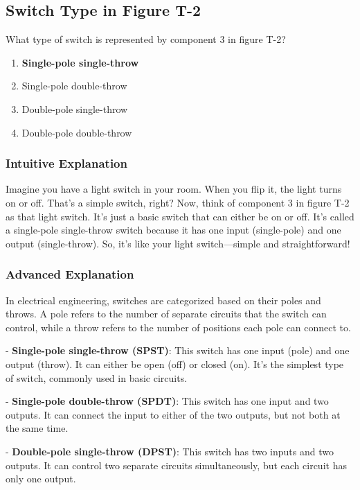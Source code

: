 \subsection{Switch Type in Figure T-2}
\label{T6A12(A)}

\begin{tcolorbox}[colback=gray!10!white,colframe=black!75!black,title=T6A12(A)]
What type of switch is represented by component 3 in figure T-2?
\begin{enumerate}[label=\Alph*)]
    \item \textbf{Single-pole single-throw}
    \item Single-pole double-throw
    \item Double-pole single-throw
    \item Double-pole double-throw
\end{enumerate}
\end{tcolorbox}

\subsubsection{Intuitive Explanation}
Imagine you have a light switch in your room. When you flip it, the light turns on or off. That's a simple switch, right? Now, think of component 3 in figure T-2 as that light switch. It’s just a basic switch that can either be on or off. It’s called a single-pole single-throw switch because it has one input (single-pole) and one output (single-throw). So, it’s like your light switch—simple and straightforward!

\subsubsection{Advanced Explanation}
In electrical engineering, switches are categorized based on their poles and throws. A pole refers to the number of separate circuits that the switch can control, while a throw refers to the number of positions each pole can connect to. 

- \textbf{Single-pole single-throw (SPST)}: This switch has one input (pole) and one output (throw). It can either be open (off) or closed (on). It’s the simplest type of switch, commonly used in basic circuits.

- \textbf{Single-pole double-throw (SPDT)}: This switch has one input and two outputs. It can connect the input to either of the two outputs, but not both at the same time.

- \textbf{Double-pole single-throw (DPST)}: This switch has two inputs and two outputs. It can control two separate circuits simultaneously, but each circuit has only one output.

